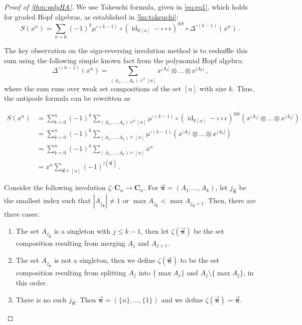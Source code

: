 \documentclass[12pt, reqno]{amsart}
\theoremstyle{definition}
\newcommand{\oPi}{\mathbf{C}}
\newcommand{\opi}{\vec{\boldsymbol{\pi}}}
\DeclareMathOperator{\id}{id}
\begin{document}
\begin{proof}[Proof of \cref{thm:polyHA}]
We use Takeuchi formula, given in \eqref{eq:eq1}, which holds for graded Hopf algebras, as established in \cref{lm:takeuchi}:
$$S(x^n) = \sum_{k = 0} (-1)^k \mu^{\circ (k-1)} \circ (\id_{\mathbb K[x]} - \iota \circ \epsilon )^{\otimes k} \circ \Delta^{\circ (k-1)} (x^n) \, .$$

The key observation on the sign-reversing involution method is to reshuffle this sum using the following simple known fact from the polynomial Hopf algebra:
$$ \Delta^{\circ (k-1) } (x^n) = \sum_{(A_1, \dots , A_k) \models^0 [n] } x^{|A_1|} \otimes \dots \otimes x^{|A_k|} \, ,$$
where the sum runs over weak set compositions of the set $[n]$ with size $k$.
Thus, the antipode formula can be rewritten as

\begin{align*}
S(x^n)&= \sum_{k=0}^n(-1)^k \sum_{(A_1, \dots , A_k) \models^0 [n]} \mu^{\circ (k-1)} \circ (\id_{\mathbb K[x]} - \iota \circ \epsilon )^{\otimes k} (x^{|A_1|} \otimes \dots \otimes x^{|A_k|})   \\
	  &= \sum_{k=0}^n(-1)^k \sum_{(A_1, \dots , A_k) \models [n]} \mu^{\circ (k-1)} (x^{|A_1|} \otimes \dots \otimes x^{|A_k|})   \\
	  &= \sum_{k=0}^n(-1)^k \sum_{(A_1, \dots , A_k) \models [n]} x^n   \\
	  &= x^n \sum_{\opi \models [n]} (-1)^{l(\opi)}\, .
\end{align*}

Consider the following involution $\zeta: \oPi_{n} \to \oPi_{n} $.
For $\opi = (A_1, \dots , A_k) $, let $j_{\opi}$ be the smallest index such that $|A_{j_{\opi}}| \neq 1$ or $\max A_{j_{\opi}} < \max A_{j_{\opi}+1} $.
Then, there are three cases:

\begin{enumerate}

\item The set $A_{j_{\opi}} $ is a singleton with $j\leq k-1$, then let $\zeta(\opi ) $ be the set composition resulting from merging $A_j $ and $A_{j+1}$.

\item The set $A_{j_{\opi}} $ is not a singleton, then we define $\zeta(\opi ) $ to be the set composition resulting from splitting $A_j $ into $\{ \max A_j \} $ and $A_j \setminus \{\max A_j \}$, in this order.

\item There is no such $j_{\opi}$. Then $\opi = (\{n\}, \dots , \{1\})$ and we define $\zeta(\opi )= \opi $.


\end{enumerate}
\end{proof}
\end{document}
